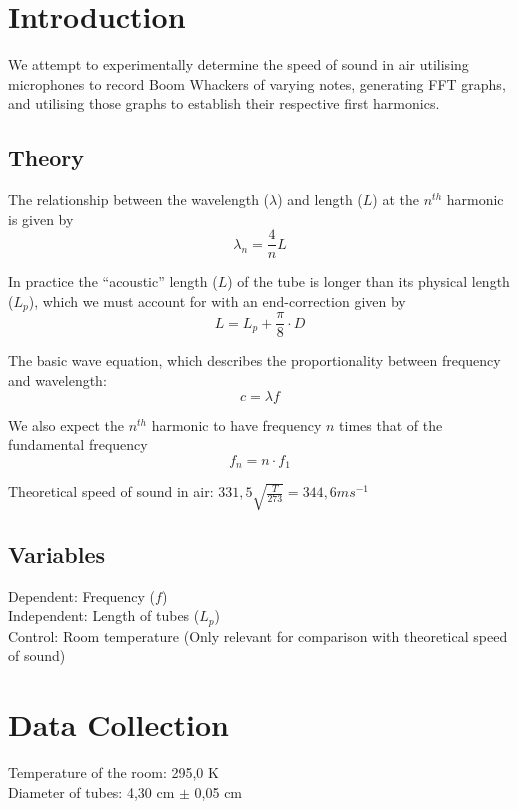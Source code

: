 \documentclass{article}
\begin{document}
\graphicspath{{images/}}
\section*{Introduction}
We attempt to experimentally determine the speed of sound in air utilising microphones to record Boom Whackers of varying notes, generating FFT graphs, and utilising those graphs to establish their respective first harmonics.

\subsection*{Theory}
The relationship between the wavelength ($\lambda$) and length ($L$) at the $n^{th}$ harmonic is given by
\begin{equation}\label{eq:LambdaLength} \lambda_n = \frac{4}{n}L \end{equation}

In practice the ``acoustic'' length ($L$) of the tube is longer than its physical length ($L_p$), which we must account for with an end-correction given by
\begin{equation}\label{eq:AccousticLength} L = L_p + \frac{\pi}{8}\cdot D \end{equation}

The basic wave equation, which describes the proportionality between frequency and wavelength:
\begin{equation}\label{eq:WaveEquation} c = \lambda f\end{equation}

We also expect the $n^{th}$ harmonic to have frequency $n$ times that of the fundamental frequency
\begin{equation}\label{eq:NthHarmonicFrequency} f_n = n\cdot f_1 \end{equation}

Theoretical speed of sound in air: $ 331,5\sqrt{\frac{T}{273}} = 344,6 ms^{-1}$ \\

\subsection*{Variables}
Dependent: Frequency ($f$) \\
Independent: Length of tubes ($L_p$)\\
Control: Room temperature (Only relevant for comparison with theoretical speed of sound)\\

\section*{Data Collection}
Temperature of the room: 295,0 K \\
Diameter of tubes: 4,30 cm $\pm$ 0,05 cm
\end{document}
